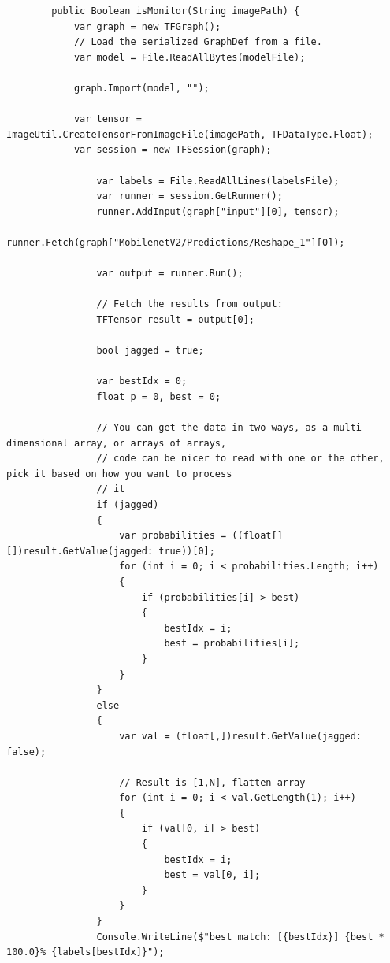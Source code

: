 \documentclass[twoside]{supsistudent}
\begin{document}
\begin{lstlisting}
        public Boolean isMonitor(String imagePath) {
            var graph = new TFGraph();
            // Load the serialized GraphDef from a file.
            var model = File.ReadAllBytes(modelFile);

            graph.Import(model, "");

            var tensor = ImageUtil.CreateTensorFromImageFile(imagePath, TFDataType.Float);
            var session = new TFSession(graph);
            
                var labels = File.ReadAllLines(labelsFile);
                var runner = session.GetRunner();
                runner.AddInput(graph["input"][0], tensor);
                runner.Fetch(graph["MobilenetV2/Predictions/Reshape_1"][0]);

                var output = runner.Run();

                // Fetch the results from output:
                TFTensor result = output[0];

                bool jagged = true;

                var bestIdx = 0;
                float p = 0, best = 0;

                // You can get the data in two ways, as a multi-dimensional array, or arrays of arrays, 
                // code can be nicer to read with one or the other, pick it based on how you want to process
                // it
                if (jagged)
                {
                    var probabilities = ((float[][])result.GetValue(jagged: true))[0];
                    for (int i = 0; i < probabilities.Length; i++)
                    {
                        if (probabilities[i] > best)
                        {
                            bestIdx = i;
                            best = probabilities[i];
                        }
                    }
                }
                else
                {
                    var val = (float[,])result.GetValue(jagged: false);

                    // Result is [1,N], flatten array
                    for (int i = 0; i < val.GetLength(1); i++)
                    {
                        if (val[0, i] > best)
                        {
                            bestIdx = i;
                            best = val[0, i];
                        }
                    }
                }
                Console.WriteLine($"best match: [{bestIdx}] {best * 100.0}% {labels[bestIdx]}");
                

\end{lstlisting}
\end{document}
